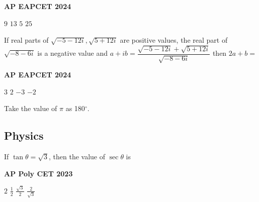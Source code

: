 \documentclass[11pt,paper=a4,answers]{exam}
\begin{document}
\begin{multicols}{2}
\begin{questions}
\begin{flushright}
\small\textbf{AP EAPCET 2024}
\end{flushright}


\begin{choices}
\choice  $\displaystyle 9$ 
\choice $\displaystyle 13$ 
\choice $\displaystyle 5$ 
\choice $\displaystyle 25$ 
\end{choices}


\question
If real parts of $\sqrt{-5-12 i}, \sqrt{5+12 i}$ are positive values, the real part of $\sqrt{-8-6 i}$ is a negative value and $a+i b=\dfrac{\sqrt{-5-12 i}+\sqrt{5+12 i}}{\sqrt{-8-6 i}}$ then $2 a+b=$

\begin{flushright}
\small\textbf{AP EAPCET 2024}
\end{flushright}


\begin{choices}
\choice  $\displaystyle 3$ 
\choice $\displaystyle 2$ 
\choice $\displaystyle -3$ 
\choice $\displaystyle -2$ 
\end{choices}























\end{questions}
\end{multicols}

\begin{center}
\Large{Take the value of $\pi$ as 180${^\circ}$.}
\end{center}

\newpage








\subsection*{Physics}
\begin{multicols}{2}
\begin{questions}
\question
If $\tan  \theta = \sqrt{3}$, then the value of $\sec \theta$ is
\begin{flushright}
\small\textbf{AP Poly CET 2023}
\end{flushright}


\begin{choices}
\choice $\displaystyle 2$ 
\choice $\displaystyle \frac{1}{2}$ 
\choice $\displaystyle \frac{\sqrt{3}}{2}$ 
\choice $\displaystyle \frac{2}{\sqrt{3}}$  
\end{choices}
\end{questions}

\end{multicols}
\end{document}
